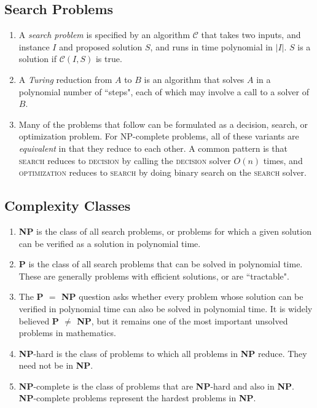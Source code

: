 \documentclass[10pt]{article}
\begin{document}
\begin{multicols}{2}
\begin{addmargin}[0.8em]{0.5em}
    \subsection{Search Problems}
    \vspace{-0.2cm}
    \begin{enumerate}[label=(\alph*)]
        \item A \textit{search problem} is specified by an algorithm $\mathcal{C}$ that takes two inputs, and instance $I$ and proposed solution $S$, and runs in time polynomial in $|I|$. $S$ is a solution if $\mathcal{C}(I,S)$ is true.
        \item A \textit{Turing} reduction from $A$ to $B$ is an algorithm that solves $A$ in a polynomial number of ``steps", each of which may involve a call to a solver of $B$. 
        \item Many of the problems that follow can be formulated as a decision, search, or optimization problem. For NP-complete problems, all of these variants are \emph{equivalent} in that they reduce to each other. A common pattern is that \textsc{search} reduces to \textsc{decision} by calling the \textsc{decision} solver $O(n)$ times, and \textsc{optimization} reduces to \textsc{search} by doing binary search on the \textsc{search} solver. 
    \end{enumerate}
    
    \vspace{-0.2cm}
    \subsection{Complexity Classes}
    \vspace{-0.2cm}
    \begin{enumerate}[label=(\alph*)]
    \item \textbf{NP} is the class of all search problems, or problems for which a given solution can be verified as a solution in polynomial time.
    \item \textbf{P} is the class of all search problems that can be solved in polynomial time. These are generally problems with efficient solutions, or are ``tractable".
    \item The \textbf{P $=$ NP} question asks whether every problem whose solution can be verified in polynomial time can also be solved in polynomial time. It is widely believed \textbf{P $\neq$ NP}, but it remains one of the most important unsolved problems in mathematics.    
    \item \textbf{NP}-hard is the class of problems to which all problems in \textbf{NP} reduce. They need not be in \textbf{NP}.
    \item \textbf{NP}-complete is the class of problems that are \textbf{NP}-hard and also in \textbf{NP}. \textbf{NP}-complete problems represent the hardest problems in \textbf{NP}. 
    

\end{enumerate}
\end{addmargin}
\end{multicols}
\end{document}
